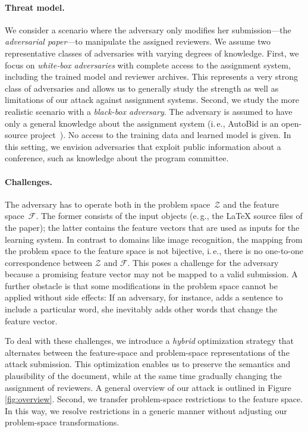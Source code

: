 \documentclass[letterpaper,twocolumn,10pt]{article}
\newcommand{\ie}{i.\,e.}
\newcommand{\eg}{e.\,g.}
\newcommand{\Dom}{\ensuremath{\mathcal{Z}}\xspace}
\newcommand{\F}{\ensuremath{\mathcal{F}}\xspace}
\begin{document}
\paragraph{Threat model.}
We consider a scenario where the adversary only modifies her submission---the \emph{adversarial paper}---to manipulate the assigned reviewers. We assume two representative classes of adversaries with varying degrees of knowledge.
First, we focus on \emph{white-box adversaries} with complete access to the assignment system, including the trained model and reviewer archives. This represents a very strong class of adversaries and allows us to generally study the strength as well as limitations of our attack against assignment systems.
Second, we study the more realistic scenario with a \emph{black-box adversary}. The adversary is assumed to have only a general knowledge about the assignment system (\ie, AutoBid is an open-source project~\cite{misc-autobid}). No access to the training data and learned model is given. In this setting, we envision adversaries that exploit public information about a conference, such as knowledge about the program committee.

\paragraph{Challenges.}
The adversary has to operate both in the problem space~\Dom and the feature space~\F. The former consists of the input objects (\eg{}, the \LaTeX{} source files of the paper); the latter contains the feature vectors that are used as inputs for the learning system. In contrast to domains like image recognition, the mapping from the problem space to the feature space is not bijective, \ie{}, there is no one-to-one correspondence between \Dom and \F. This poses a challenge for the adversary because a promising feature vector may not be mapped to a valid submission. A further {obstacle\EndAccSupp{}} is that some modifications in the problem space cannot be applied without side effects: If an adversary, for instance, adds a sentence  to include a particular word, she {inevitably\EndAccSupp{}} adds other words that change the feature vector. 

To deal with these challenges, we introduce a \emph{hybrid} optimization strategy that alternates between the feature-space and problem-space representations of the attack submission.
This optimization enables us to preserve the semantics and {plausibility\EndAccSupp{}} of the document, while at the same time gradually changing the assignment of reviewers. A general overview of our attack is outlined in Figure \ref{fig:overview}.
Second, we transfer problem-space restrictions to the feature space. In this way, we {resolve\EndAccSupp{}} restrictions in a generic manner without adjusting our problem-space transformations.
\end{document}

